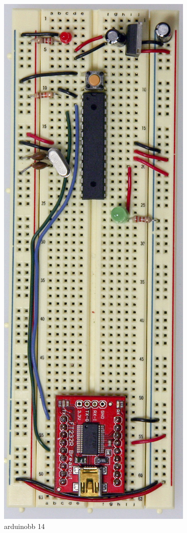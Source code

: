 \begin{figure}[!htb]
 \centering
 \includegraphics[scale=0.3]{img/arduino_breadboard/arduinobb_14.jpg}
 \caption{arduinobb 14}
 \label{arduinobb 14}
\end{figure}



